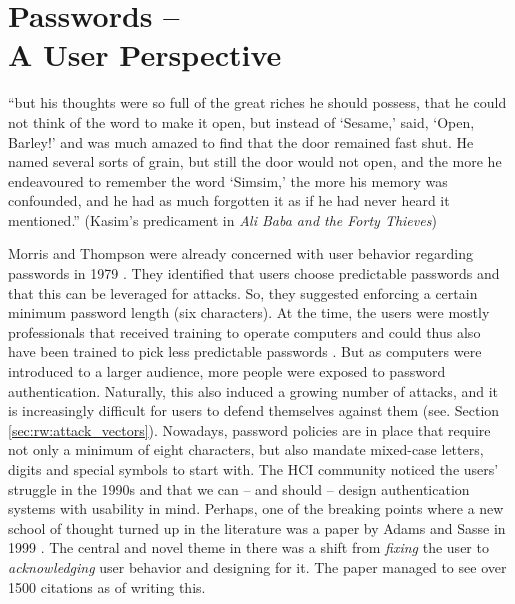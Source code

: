 \chapter[Passwords -- A User Perspective]{Passwords -- \\
	A User Perspective}\label{chap:rw:user_perspective}

``but his thoughts were so full of the great riches he should possess, that he could not think of the word to make it open, but instead of `Sesame,' said, `Open, Barley!' and was much amazed to find that the door remained fast shut. He named several sorts of grain, but still the door would not open, and the more he endeavoured to remember the word `Simsim,' the more his memory was confounded, and he had as much forgotten it as if he had never heard it mentioned.'' (Kasim's predicament in \textit{Ali Baba and the Forty Thieves}) 


Morris and Thompson were already concerned with user behavior regarding passwords in 1979 \cite{Morris1979PasswordSecurity}. They identified that users choose predictable passwords and that this can be leveraged for attacks. So, they suggested enforcing a certain minimum password length (six characters). At the time, the users were mostly professionals that received training to operate computers and could thus also have been trained to pick less predictable passwords \cite{Maguire2012YouOnlyLiveTwice}. But as computers were introduced to a larger audience, more people were exposed to password authentication. Naturally, this also induced a growing number of attacks, and it is increasingly difficult for users to defend themselves against them (see. Section \ref{sec:rw:attack_vectors}). Nowadays, password policies are in place that require not only a minimum of eight characters, but also mandate mixed-case letters, digits and special symbols to start with. The HCI community noticed the users' struggle in the 1990s and that we can -- and should -- design authentication systems with usability in mind. Perhaps, one of the breaking points where a new school of thought turned up in the literature was a paper by Adams and Sasse in 1999 \cite{Adams1999UsersEnemy}. The central and novel theme in there was a shift from \textit{fixing} the user to \textit{acknowledging} user behavior and designing for it. The paper managed to see over 1500 citations as of writing this.

